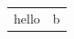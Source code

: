 \documentclass{article}
\begin{document}
\begin{tabular}{p{3cm}l}
\begin{minipage}{2cm}hello\end{minipage} & b \\
\end{tabular}
\end{document}
